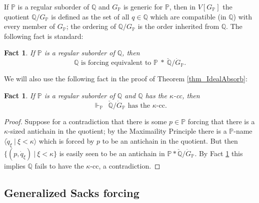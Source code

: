 \documentclass{amsart}
\newtheorem{fact}[theorem]{Fact}
\begin{document}
If $\mathbb{P}$ is a regular suborder of $\mathbb{Q}$ and $G_{\mathbb{P}}$ is generic for $\mathbb{P}$, then in $V[G_{\mathbb{P}}]$ the quotient $\mathbb{Q}/G_{\mathbb{P}}$ is defined as the set of all $q \in \mathbb{Q}$ which are compatible (in $\mathbb{Q}$) with every member of $G_{\mathbb{P}}$; the ordering of $\mathbb{Q}/G_{\mathbb{P}}$ is the order inherited from $\mathbb{Q}$.  The following fact is standard:
\begin{fact}\label{fact_OneStepTwoSteps}
If $\mathbb{P}$ is a regular suborder of $\mathbb{Q}$, then 
\[
\mathbb{Q} \text{ is forcing equivalent to } \mathbb{P}  \ * \ \check{\mathbb{Q}}/\dot{G}_{\mathbb{P}}.
\]
\end{fact}

We will also use the following fact in the proof of Theorem  \ref{thm_IdealAbsorb}:
\begin{fact}\label{fact_CannotAddAntichains}
If $\mathbb{P}$ is a regular suborder of $\mathbb{Q}$ and $\mathbb{Q}$ has the $\kappa$-cc, then 
\[
\Vdash_{\mathbb{P}} \ \ \check{\mathbb{Q}}/\dot{G}_{\mathbb{P}} \text{ has the } \kappa \text{-cc}.
\]
\end{fact}
\begin{proof}
Suppose for a contradiction that there is some $p \in \mathbb{P}$ forcing that there is a $\kappa$-sized antichain in the quotient; by the Maximaility Principle there is a $\mathbb{P}$-name $\langle \dot{q}_\xi \ | \ \xi < \kappa \rangle$ which is forced by $p$ to be an antichain in the quotient.  But then $\{ (p,\dot{q}_\xi) \ | \ \xi < \kappa \}$ is easily seen to be an antichain in $\mathbb{P} * \check{\mathbb{Q}}/\dot{G}_{\mathbb{P}}$.  By Fact \ref{fact_OneStepTwoSteps} this implies $\mathbb{Q}$ fails to have the $\kappa$-cc, a contradiction.
\end{proof}


\subsection{Generalized Sacks forcing}
\end{document}
